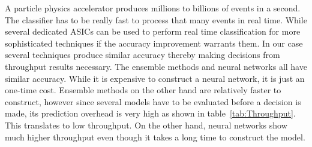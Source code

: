 A particle physics accelerator produces millions to billions of events in a second. The classifier has to be really fast to process that many events in real time. While several dedicated ASICs can be used to perform real time classification for more sophisticated techniques if the accuracy improvement warrants them. In our case several techniques produce similar accuracy thereby making decisions from throughput results necessary. The ensemble methods and neural networks all have similar accuracy. While it is expensive to construct a neural network, it is just an one-time cost. Ensemble methods on the other hand are relatively faster to construct, however since several models have to be evaluated before a decision is made, its prediction overhead is very high as shown in table~\ref{tab:Throughput}. This translates to low throughput. On the other hand, neural networks show much higher throughput even though it takes a long time to construct the model.


\begin{table}[h]
\centering
\caption{Throughput results for different classifiers}
\label{tab:Throughput} 
\end{table}



